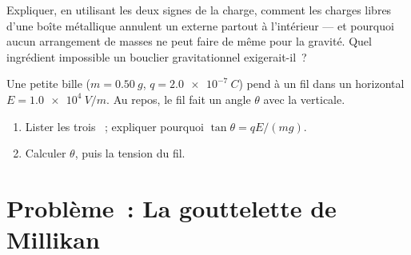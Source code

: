 \begin{exercise}[$\star\star\star$]\label{exo:g11:electric-gravitational-fields:14}
Expliquer, en utilisant les deux signes de la charge, comment les
charges libres d'une boîte métallique annulent un
 externe partout à
l'intérieur --- et pourquoi aucun arrangement de masses ne peut faire de
même pour la gravité. Quel ingrédient impossible un bouclier
gravitationnel exigerait-il~?
\end{exercise}

\begin{exercise}[$\star\star\star$]\label{exo:g11:electric-gravitational-fields:15}
Une petite bille ($m = \qty{0.50}{g}$, $q = \qty{+2.0e-7}{C}$) pend à un
fil dans un 
horizontal $E = \qty{1.0e4}{V/m}$. Au repos, le fil fait un angle
$\theta$ avec la verticale.
\begin{enumerate}
  \item Lister les trois ~; expliquer pourquoi
        $\tan\theta = qE / (mg)$.
  \item Calculer $\theta$, puis la
        tension du fil.
\end{enumerate}
\end{exercise}

\section{Problème~: La gouttelette de Millikan}


